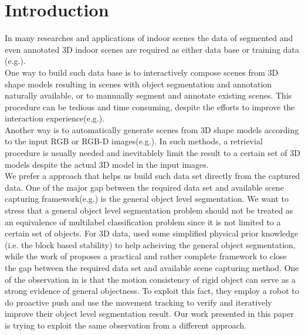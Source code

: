 \section{Introduction}
\label{sec:intro}
In many researches and applications of indoor scenes the data of segmented and even annotated 3D indoor scenes are required as either data base or training data (e.g.\cite{SearchClassify}\cite{SceneFromExample}\cite{Fisher:2012:ESO:2366145.2366154}\cite{Chen:2014:ASM:2661229.2661239}\cite{Fisher:ActivityCentricSceneSynthesis}).\\
One way to build such data base is to interactively compose scenes from 3D shape models resulting in scenes with object segmentation and annotation naturally available, or to mannually segment and annotate existing scenes. This procedure can be tedious and time consuming, despite the efforts to improve the interaction experience(e.g.\cite{Merrell:2011:IFL:2010324.1964982}\cite{Xu:2013:SSC:2461912.2461968}).\\
Another way is to automatically generate scenes from 3D shape models according to the input RGB or RGB-D images(e.g.\cite{Liu2015Model}\cite{Chen:2014:ASM:2661229.2661239}). In such methods, a retrievial procedure is usually needed and inevitablely limit the result to a certain set of 3D models despite the actual 3D model in the input images.\\
We prefer a approach that helps us build such data set directly from the captured data. One of the major gap between the required data set and available scene capturing framework(e.g.\cite{KinectFusion}) is the general object level segmentation. We want to stress that a general object level segmentation problem should not be treated as an equivalence of multilabel classification problem since it is not limited to a certain set of objects. For 3D data, \cite{3DReasoningfromBlockstoStability} used some simplified physical prior knowledge (i.e. the block based stability) to help acheiving the general object segmentation, while the work of \cite{Xu:2015:ACS:2816795.2818075} proposes a practical and rather complete framework to close the gap between the required data set and available scene capturing method. One of the observation in \cite{Xu:2015:ACS:2816795.2818075} is that the motion consistency of rigid object can serve as a strong evidence of general objectness. To exploit this fact, they employ a robot to do proactive push and use the movement tracking to verify and iteratively improve their object level segmentation result. Our work presented in this paper is trying to exploit the same observation from a different approach.\\
